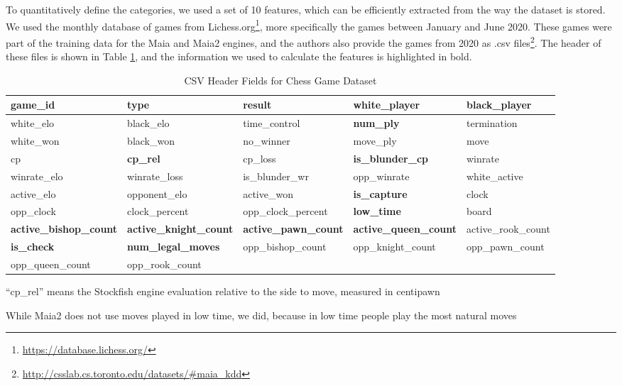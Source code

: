 To quantitatively define the categories, we used a set of 10 features, which can be efficiently extracted from the way the dataset is stored.
We used the monthly database of games from Lichess.org\footnote{\url{https://database.lichess.org/}}, more specifically the games between January and June 2020.
These games were part of the training data for the Maia and Maia2 engines, and the authors also provide the games from 2020 as .csv files\footnote{\url{http://csslab.cs.toronto.edu/datasets/\#maia_kdd}}.
The header of these files is shown in Table \ref{tab:lichess_csv_header}, and the information we used to calculate the features is highlighted in bold.

\begin{table}[H]
\hspace*{-1cm}
\begin{threeparttable}
\caption{CSV Header Fields for Chess Game Dataset}
\label{tab:lichess_csv_header}
\begin{tabular}{|l|l|l|l|l|}
\toprule
game\_id & type & result & white\_player & black\_player \\ \hline
white\_elo & black\_elo & time\_control & \textbf{num\_ply} & termination \\ \hline
white\_won & black\_won & no\_winner & move\_ply & move \\ \hline
cp & \textbf{cp\_rel}\* & cp\_loss & \textbf{is\_blunder\_cp} & winrate \\ \hline
winrate\_elo & winrate\_loss & is\_blunder\_wr & opp\_winrate & white\_active \\ \hline
active\_elo & opponent\_elo & active\_won & \textbf{is\_capture} & clock \\ \hline
opp\_clock & clock\_percent & opp\_clock\_percent & \textbf{low\_time}\*\* & board \\ \hline
\textbf{active\_bishop\_count} & \textbf{active\_knight\_count} & \textbf{active\_pawn\_count} & \textbf{active\_queen\_count} & active\_rook\_count \\ \hline
\textbf{is\_check} & \textbf{num\_legal\_moves} & opp\_bishop\_count & opp\_knight\_count & opp\_pawn\_count \\ \hline
opp\_queen\_count & opp\_rook\_count &  &  &  \\
\bottomrule
\end{tabular}
\begin{tablenotes}
\small
\item \* ``cp\_rel'' means the Stockfish engine evaluation relative to the side to move, measured in centipawn
\item \*\* While Maia2 does not use moves played in low time, we did, because in low time people play the most natural moves
\end{tablenotes}
\end{threeparttable}
\end{table}

